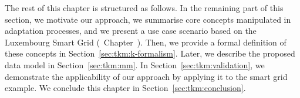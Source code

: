 The rest of this chapter is structured as follows.
In the remaining part of this section, we motivate our approach, we summarise core concepts manipulated in adaptation processes, and we present a use case scenario based on the Luxembourg Smart Grid (\cf~Chapter~).
Then, we provide a formal definition of these concepts in Section~\ref{sec:tkm:k-formalism}.
Later, we describe the proposed data model in Section~\ref{sec:tkm:mm}.
In Section~\ref{sec:tkm:validation}, we demonstrate the applicability of our approach by applying it to the smart grid example.
We conclude this chapter in Section~\ref{sec:tkm:conclusion}.









